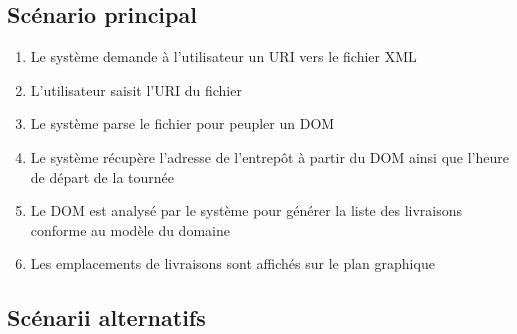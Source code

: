 \documentclass{article}
\begin{document}
\subsection{Scénario principal}

\begin{enumerate}
\item Le système demande à l'utilisateur un URI vers le fichier XML
\item L'utilisateur saisit l'URI du fichier
\item Le système parse le fichier pour peupler un DOM
\item Le système récupère l'adresse de l'entrepôt à partir du DOM ainsi que l'heure de départ de la tournée
\item Le DOM est analysé par le système pour générer la liste des livraisons conforme au modèle du domaine
\item Les emplacements de livraisons sont affichés sur le plan graphique
\end{enumerate}

\subsection{Scénarii alternatifs}
\end{document}

